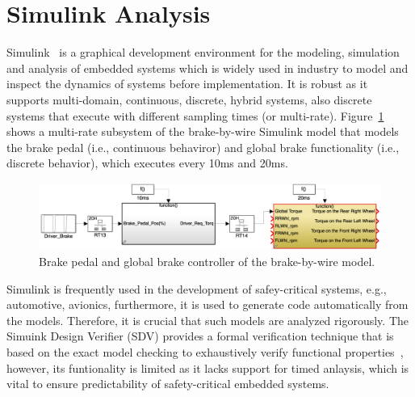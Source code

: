 \section{Simulink Analysis}
Simulink~\cite{JamesB.Dabney2003MasteringSimulink} is a graphical development environment for the modeling, simulation and analysis of embedded systems which is widely used in industry to model and inspect the dynamics of systems before implementation. It is robust as it supports multi-domain, continuous, discrete, hybrid systems, also discrete systems that execute with different sampling times (or multi-rate). Figure~\ref{fig_sm_multi-rate} shows a multi-rate subsystem of the brake-by-wire Simulink model that models the brake pedal (i.e., continuous behaviror) and global brake functionality (i.e., discrete behavior), which executes every 10ms and 20ms.  
\begin{figure}[h]
	\centering
	\includegraphics[width=0.9\linewidth]{images/sm}
	\caption{Brake pedal and global brake controller of the brake-by-wire model.}
	\label{fig_sm_multi-rate}
\end{figure}

Simulink is frequently used in the development of safey-critical systems, e.g., automotive, avionics, furthermore, it is used to generate code automatically from the models. Therefore, it is crucial that such models are analyzed rigorously. The Simuink Design Verifier (SDV) provides a formal verification technique that is based on the exact model checking to exhaustively verify functional properties~\cite{MathWokrksSimulinkVerifier}, however, its funtionality is limited as it lacks support for timed anlaysis, which is vital to ensure predictability of safety-critical embedded systems. 

